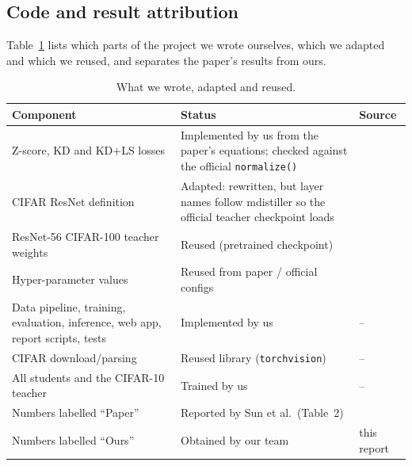 \documentclass[12pt,a4paper]{article}
\begin{document}
\subsection{Code and result attribution}
Table~\ref{tab:attr} lists which parts of the project we wrote ourselves, which we adapted and which we reused, and separates the paper's results from ours.
\begin{table}[H]
\centering
\caption{What we wrote, adapted and reused.}
\label{tab:attr}
\small
\begin{tabularx}{\textwidth}{>{\raggedright\arraybackslash}p{}>{\raggedright\arraybackslash}X l}
\toprule
Component & Status & Source \\
\midrule
Z-score, KD and KD+LS losses & Implemented by us from the paper's equations; checked against the official \texttt{normalize()} & \cite{sun2024code} \\
CIFAR ResNet definition & Adapted: rewritten, but layer names follow mdistiller so the official teacher checkpoint loads & \cite{mdistiller} \\
ResNet-56 CIFAR-100 teacher weights & Reused (pretrained checkpoint) & \cite{mdistiller} \\
Hyper-parameter values & Reused from paper / official configs & \cite{sun2024} \\
Data pipeline, training, evaluation, inference, web app, report scripts, tests & Implemented by us & -- \\
CIFAR download/parsing & Reused library (\texttt{torchvision}) & -- \\
All students and the CIFAR-10 teacher & Trained by us & -- \\
\midrule
Numbers labelled ``Paper'' & Reported by Sun et al.\ (Table~2) & \cite{sun2024} \\
Numbers labelled ``Ours'' & Obtained by our team & this report \\
\bottomrule
\end{tabularx}
\end{table}
\end{document}
